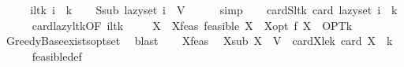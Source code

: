 \begin{isabellebody}
%
\isadelimproof
%
\endisadelimproof
%
\isatagproof
{}\isamarkupfalse%
\ {\isacharminus}{\kern0pt}\isanewline
\ \ \isamarkupfalse%
\ i{\isacharunderscore}{\kern0pt}lt{\isacharunderscore}{\kern0pt}k{\isacharcolon}{\kern0pt}\ {\isachardoublequoteopen}i\ {\isacharless}{\kern0pt}\ k{\isachardoublequoteclose}\isanewline
\isanewline
\ \ \isamarkupfalse%
\ S{\isacharunderscore}{\kern0pt}sub{\isacharcolon}{\kern0pt}\ {\isachardoublequoteopen}lazy{\isacharunderscore}{\kern0pt}set\ i\ {\isasymsubseteq}\ V{\isachardoublequoteclose}\isanewline
\ \ \ \ \isamarkupfalse%
\ simp\isanewline
\ \ \isamarkupfalse%
\ cardS{\isacharunderscore}{\kern0pt}lt{\isacharunderscore}{\kern0pt}k{\isacharcolon}{\kern0pt}\ {\isachardoublequoteopen}card\ {\isacharparenleft}{\kern0pt}lazy{\isacharunderscore}{\kern0pt}set\ i{\isacharparenright}{\kern0pt}\ {\isacharless}{\kern0pt}\ k{\isachardoublequoteclose}\isanewline
\ \ \ \ \isamarkupfalse%
\ card{\isacharunderscore}{\kern0pt}lazy{\isacharunderscore}{\kern0pt}lt{\isacharunderscore}{\kern0pt}k{\isacharbrackleft}{\kern0pt}OF\ i{\isacharunderscore}{\kern0pt}lt{\isacharunderscore}{\kern0pt}k{\isacharbrackright}{\kern0pt}\ \isakeywordONE{{\isachardot}{\kern0pt}}\isamarkupfalse%
\isanewline
\isanewline
\ \ \isamarkupfalse%
\ X\ \ X{\isacharunderscore}{\kern0pt}feas{\isacharcolon}{\kern0pt}\ {\isachardoublequoteopen}feasible\ X{\isachardoublequoteclose}\ \ X{\isacharunderscore}{\kern0pt}opt{\isacharcolon}{\kern0pt}\ {\isachardoublequoteopen}f\ X\ {\isacharequal}{\kern0pt}\ OPT{\isacharunderscore}{\kern0pt}k{\isachardoublequoteclose}\isanewline
\ \ \ \ \isamarkupfalse%
\ Greedy{\isacharunderscore}{\kern0pt}Base{\isachardot}{\kern0pt}exists{\isacharunderscore}{\kern0pt}opt{\isacharunderscore}{\kern0pt}set\ \isamarkupfalse%
\ blast\isanewline
\isanewline
\ \ \isamarkupfalse%
\ X{\isacharunderscore}{\kern0pt}feas\ \isamarkupfalse%
\ X{\isacharunderscore}{\kern0pt}sub{\isacharcolon}{\kern0pt}\ {\isachardoublequoteopen}X\ {\isasymsubseteq}\ V{\isachardoublequoteclose}\ \ cardX{\isacharunderscore}{\kern0pt}le{\isacharunderscore}{\kern0pt}k{\isacharcolon}{\kern0pt}\ {\isachardoublequoteopen}card\ X\ {\isasymle}\ k{\isachardoublequoteclose}\isanewline
\ \ \ \ \isamarkupfalse%
\ feasible{\isacharunderscore}{\kern0pt}def\ \isamarkupfalse%

\end{isabellebody}
